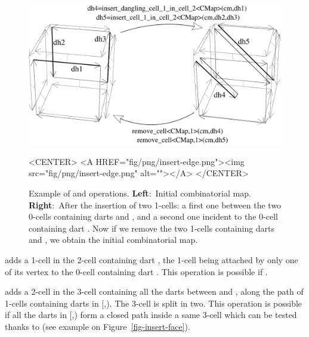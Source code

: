 \begin{figure}[htb]
  \begin{ccTexOnly}
    \begin{center}
      \includegraphics[width=.72\textwidth]{Combinatorial_map/fig/pdf/insert-edge}
    \end{center}
  \end{ccTexOnly}
  \begin{ccHtmlOnly}
    <CENTER> <A HREF="fig/png/insert-edge.png"><img
    src="fig/png/insert-edge.png" alt=""></A> </CENTER>
  \end{ccHtmlOnly}
  \caption{Example of  and
     operations. \textbf{Left}:~Initial
    combinatorial map.  \textbf{Right}:~After the insertion of two
    1-cells: a first one between the two 0-cells containing darts
     and , and a second one incident to the 0-cell
    containing dart . Now if we remove the two
    1-cells containing darts  and , we obtain the
    initial combinatorial map.}
  \label{fig-insert-edge}
\end{figure}


 adds a 1-cell in
the 2-cell containing dart , the 1-cell being attached by only
one of its vertex to the 0-cell containing dart .
This operation is possible if \myin{}.

 adds a
2-cell in the 3-cell containing all the darts between
 and , along the path of 1-cells
containing darts in [,). The 3-cell is
split in two. This operation is possible if all the 
darts in [,) form a closed path inside a same 3-cell 
which can be tested thanks to
(see example on Figure~\ref{fig-insert-face}).

